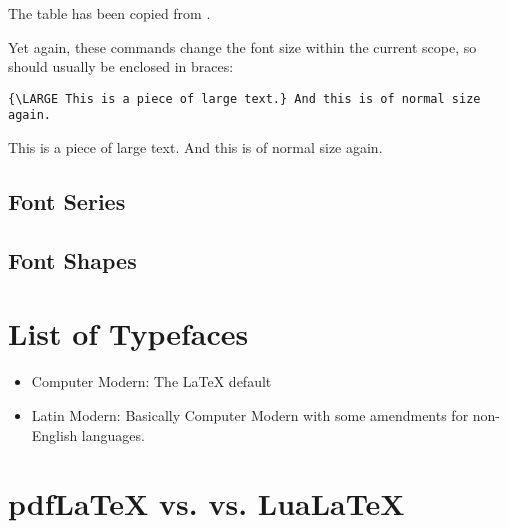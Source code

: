 \documentclass[a4paper,oneside,11pt]{article}
\newcommand\XeLaTeX{\hologo{XeLaTeX}}
\begin{document}
The table has been copied from \cite{wikibooks:fonts}.

Yet again, these commands change the font size within the current scope, so should
usually be enclosed in braces:

\begin{verbatim}
{\LARGE This is a piece of large text.} And this is of normal size again.
\end{verbatim}

{\LARGE This is a piece of large text.} And this is of normal size again.

\subsection{Font Series}
\label{subsec:font-series}


\subsection{Font Shapes}
\label{subsec:font-shapes}

\section{List of Typefaces}
\label{sec:tflist}

\begin{itemize}
    \item Computer Modern: The \LaTeX{} default
    \item  
        Latin  Modern: Basically  Computer  Modern with  some  amendments  for
        non-English languages.
\end{itemize}


\section{pdf\LaTeX{} vs. \XeLaTeX{} vs. Lua\LaTeX}
\label{sec:fontsel:pdf:xe:lua}
\end{document}
